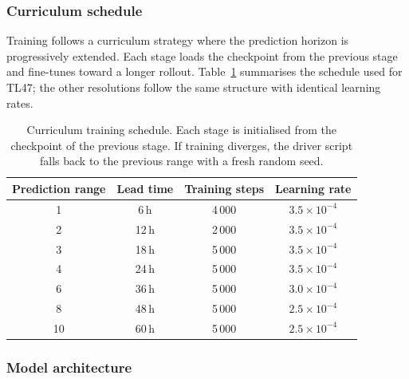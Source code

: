 \subsubsection{Curriculum schedule}

Training follows a curriculum strategy where the prediction horizon is progressively extended.
Each stage loads the checkpoint from the previous stage and fine-tunes toward a longer rollout.
Table~\ref{tab:curriculum} summarises the schedule used for TL47; the other resolutions follow the same structure with identical learning rates.

\begin{table}[htbp]
\centering
\small
\begin{tabular}{cccc}
\hline
\textbf{Prediction range} & \textbf{Lead time} & \textbf{Training steps} & \textbf{Learning rate} \\
\hline\hline
1 & 6\,h & 4\,000 & $3.5 \times 10^{-4}$ \\
2 & 12\,h & 2\,000 & $3.5 \times 10^{-4}$ \\
3 & 18\,h & 5\,000 & $3.5 \times 10^{-4}$ \\
4 & 24\,h & 5\,000 & $3.5 \times 10^{-4}$ \\
6 & 36\,h & 5\,000 & $3.0 \times 10^{-4}$ \\
8 & 48\,h & 5\,000 & $2.5 \times 10^{-4}$ \\
10 & 60\,h & 5\,000 & $2.5 \times 10^{-4}$ \\
\hline
\end{tabular}
\caption{Curriculum training schedule.  Each stage is initialised from the checkpoint of the previous stage.  If training diverges, the driver script falls back to the previous range with a fresh random seed.}
\label{tab:curriculum}
\end{table}

\subsubsection{Model architecture}

